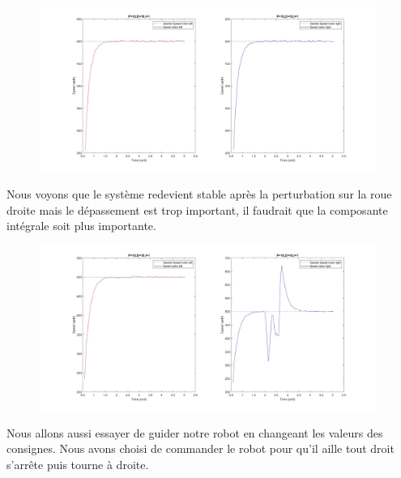 \documentclass[a4paper]{article}
\begin{document}
		\begin{figure}[h]
			\centering
			\includegraphics[width = 11cm]{imgs/fig8.jpg}
			\caption{}
		\end{figure}
		Nous voyons que le système redevient stable après la perturbation sur la roue droite mais le dépassement est trop important, il faudrait que la composante intégrale soit plus importante.
		\newpage
		
		\begin{figure}[h]
			\centering
			\includegraphics[width = 11cm]{imgs/fig9.jpg}
			\caption{}
		\end{figure}
		Nous allons aussi essayer de guider notre robot en changeant les valeurs des consignes. Nous avons choisi de commander le robot pour qu’il aille tout droit s’arrête puis tourne à droite.
		
\end{document}
